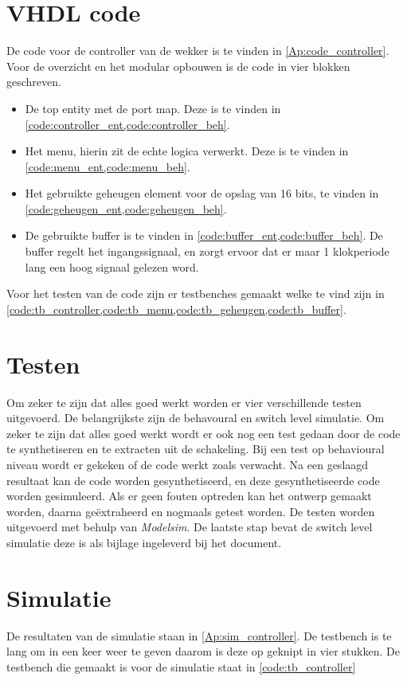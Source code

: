 \section{VHDL code}
De code voor de controller van de wekker is te vinden in \cref{Ap:code_controller}. Voor de overzicht en het modular opbouwen is de code in vier blokken geschreven.
\begin{itemize}[nolistsep]
\item De top entity met de port map. Deze is te vinden in \cref{code:controller_ent,code:controller_beh}.
\item Het menu, hierin zit de echte logica verwerkt. Deze is te vinden in \cref{code:menu_ent,code:menu_beh}.
\item Het gebruikte geheugen element voor de opslag van 16 bits, te vinden in \cref{code:geheugen_ent,code:geheugen_beh}.
\item De gebruikte buffer is te vinden in \cref{code:buffer_ent,code:buffer_beh}. De buffer regelt het ingangssignaal, en zorgt ervoor dat er maar 1 klokperiode lang een hoog signaal gelezen word.
\end{itemize}
Voor het testen van de code zijn er testbenches gemaakt welke te vind zijn in \cref{code:tb_controller,code:tb_menu,code:tb_geheugen,code:tb_buffer}.

\section{Testen}
Om zeker te zijn dat alles goed werkt worden er vier verschillende testen uitgevoerd. De belangrijkste zijn de behavoural en switch level simulatie. Om zeker te zijn dat alles goed werkt wordt er ook nog een test gedaan door de code te synthetiseren en te extracten uit de schakeling.
Bij een test op behavioural niveau wordt er gekeken of de code werkt zoals verwacht. Na een geslaagd resultaat kan de code worden gesynthetiseerd, en deze gesynthetiseerde code worden gesimuleerd. Als er geen fouten optreden kan het ontwerp gemaakt worden, daarna ge\"{e}xtraheerd en nogmaals getest worden. De testen worden uitgevoerd met behulp van \emph{Modelsim}. De laatste stap bevat de switch level simulatie deze is als bijlage ingeleverd bij het document.


\section{Simulatie}
De resultaten van de simulatie staan in \cref{Ap:sim_controller}. De testbench is te lang om in een keer weer te geven daarom is deze op geknipt in vier stukken. De testbench die gemaakt is voor de simulatie staat in \cref{code:tb_controller}
